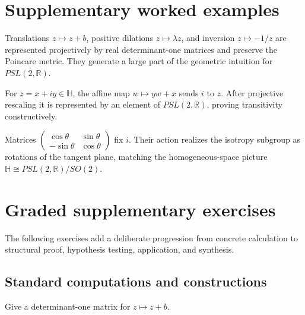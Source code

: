 \section{Supplementary worked examples}
\label{sec:vii33-pedagogy}

\begin{example}\label{ex:vii33-ped-01}
Translations \(z\mapsto z+b\), positive dilations \(z\mapsto\lambda z\), and inversion \(z\mapsto-1/z\) are represented projectively by real determinant-one matrices and preserve the Poincare metric.  They generate a large part of the geometric intuition for \(PSL(2,\mathbb R)\).
\end{example}

\begin{example}\label{ex:vii33-ped-02}
For \(z=x+iy\in\mathbb H\), the affine map \(w\mapsto yw+x\) sends \(i\) to \(z\).  After projective rescaling it is represented by an element of \(PSL(2,\mathbb R)\), proving transitivity constructively.
\end{example}

\begin{example}[Stabilizer of \(i\)]\label{ex:vii33-ped-03}
Matrices \(\begin{pmatrix}\cos\theta&\sin\theta\\-\sin\theta&\cos\theta\end{pmatrix}\) fix \(i\).  Their action realizes the isotropy subgroup as rotations of the tangent plane, matching the homogeneous-space picture \(\mathbb H\cong PSL(2,\mathbb R)/SO(2)\).
\end{example}

\section{Graded supplementary exercises}
The following exercises add a deliberate progression from concrete calculation to structural proof, hypothesis testing, application, and synthesis.

\subsection*{Standard computations and constructions}

\begin{exercise}\label{exr:vii33-ped-01}
Give a determinant-one matrix for \(z\mapsto z+b\).
\end{exercise}

